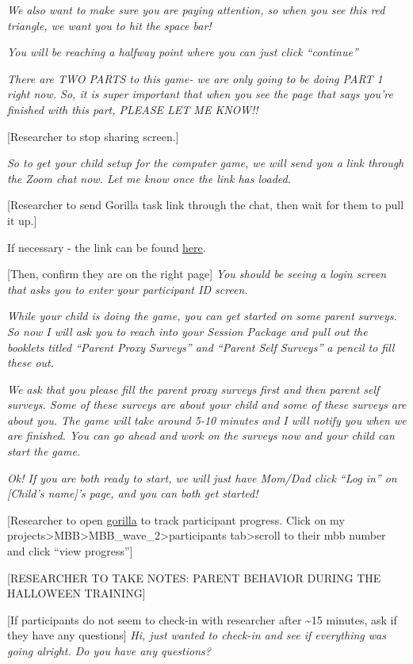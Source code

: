 \documentclass[]{book}
\begin{document}
\emph{We also want to make sure you are paying attention, so when you see this red triangle, we want you to hit the space bar!}

\emph{You will be reaching a halfway point where you can just click ``continue''}

\emph{There are TWO PARTS to this game- we are only going to be doing PART 1 right now. So, it is super important that when you see the page that says you're finished with this part, PLEASE LET ME KNOW!!}

{[}Researcher to stop sharing screen.{]}

\emph{So to get your child setup for the computer game, we will send you a link through the Zoom chat now. Let me know once the link has loaded.}

{[}Researcher to send Gorilla task link through the chat, then wait for them to pull it up.{]}

If necessary - the link can be found \href{https://research.sc/participant/login/20451/publicid}{here}.

{[}Then, confirm they are on the right page{]} \emph{You should be seeing a login screen that asks you to enter your participant ID screen.}

\emph{While your child is doing the game, you can get started on some parent surveys. So now I will ask you to reach into your Session Package and pull out the booklets titled ``Parent Proxy Surveys'' and ``Parent Self Surveys'' a pencil to fill these out.}

\emph{We ask that you please fill the parent proxy surveys first and then parent self surveys. Some of these surveys are about your child and some of these surveys are about you. The game will take around 5-10 minutes and I will notify you when we are finished. You can go ahead and work on the surveys now and your child can start the game.}

\emph{Ok! If you are both ready to start, we will just have Mom/Dad click ``Log in'' on {[}Child's name{]}'s page, and you can both get started!}

{[}Researcher to open \href{https://gorilla.sc}{gorilla} to track participant progress. Click on my projects\textgreater{}MBB\textgreater{}MBB\_wave\_2\textgreater{}participants tab\textgreater{}scroll to their mbb number and click ``view progress''{]}

{[}RESEARCHER TO TAKE NOTES: PARENT BEHAVIOR DURING THE HALLOWEEN TRAINING{]}

{[}If participants do not seem to check-in with researcher after \textasciitilde{}15 minutes, ask if they have any questions{]} \emph{Hi, just wanted to check-in and see if everything was going alright. Do you have any questions?}
\end{document}
